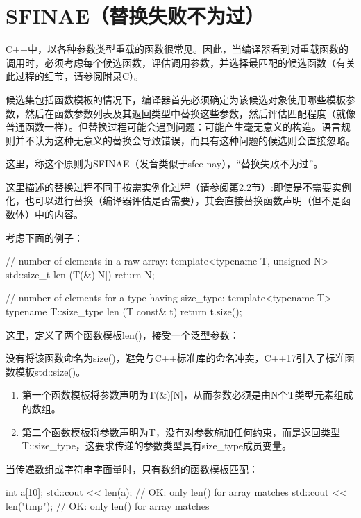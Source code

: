 \section{SFINAE（替换失败不为过）}

C++中，以各种参数类型重载的函数很常见。因此，当编译器看到对重载函数的调用时，必须考虑每个候选函数，评估调用参数，并选择最匹配的候选函数（有关此过程的细节，请参阅附录C）。

候选集包括函数模板的情况下，编译器首先必须确定为该候选对象使用哪些模板参数，然后在函数参数列表及其返回类型中替换这些参数，然后评估匹配程度（就像普通函数一样）。但替换过程可能会遇到问题：可能产生毫无意义的构造。语言规则并不认为这种无意义的替换会导致错误，而具有这种问题的候选则会直接忽略。

这里，称这个原则为SFINAE（发音类似于sfee-nay），“替换失败不为过”。

这里描述的替换过程不同于按需实例化过程（请参阅第2.2节）:即使是不需要实例化，也可以进行替换（编译器评估是否需要），其会直接替换函数声明（但不是函数体）中的内容。

考虑下面的例子：

\begin{cpp}
// number of elements in a raw array:
template<typename T, unsigned N>
std::size_t len (T(&)[N]) {
	return N;
}

// number of elements for a type having size_type:
template<typename T>
typename T::size_type len (T const& t) {
	return t.size();
}
\end{cpp}

这里，定义了两个函数模板len()，接受一个泛型参数：

\begin{notice}
没有将该函数命名为size()，避免与C++标准库的命名冲突，C++17引入了标准函数模板std::size()。
\end{notice}

\begin{enumerate}
\item 
第一个函数模板将参数声明为T(\&)[N]，从而参数必须是由N个T类型元素组成的数组。

\item 
第二个函数模板将参数声明为T，没有对参数施加任何约束，而是返回类型T::size\_type，这要求传递的参数类型具有size\_type成员变量。
\end{enumerate}

当传递数组或字符串字面量时，只有数组的函数模板匹配：

\begin{cpp}
int a[10];
std::cout << len(a); // OK: only len() for array matches
std::cout << len("tmp"); // OK: only len() for array matches
\end{cpp}

